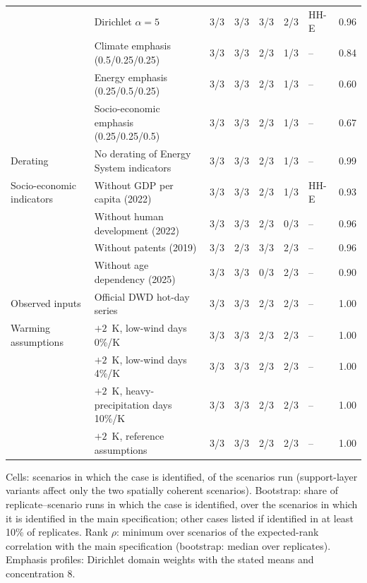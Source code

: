 \begin{tabular}{@{}p{2.9cm}p{5.4cm}ccccp{3.1cm}c@{}}
 & Dirichlet $\alpha=5$ & 3/3 & 3/3 & 3/3 & 2/3 & HH-E & 0.96 \\
 & Climate emphasis (0.5/0.25/0.25) & 3/3 & 3/3 & 2/3 & 1/3 & -- & 0.84 \\
 & Energy emphasis (0.25/0.5/0.25) & 3/3 & 3/3 & 2/3 & 1/3 & -- & 0.60 \\
 & Socio-economic emphasis (0.25/0.25/0.5) & 3/3 & 3/3 & 2/3 & 1/3 & -- & 0.67 \\
\midrule
Derating & No derating of Energy System indicators & 3/3 & 3/3 & 2/3 & 1/3 & -- & 0.99 \\
\midrule
Socio-economic indicators & Without GDP per capita (2022) & 3/3 & 3/3 & 2/3 & 1/3 & HH-E & 0.93 \\
 & Without human development (2022) & 3/3 & 3/3 & 2/3 & 0/3 & -- & 0.96 \\
 & Without patents (2019) & 3/3 & 2/3 & 3/3 & 2/3 & -- & 0.96 \\
 & Without age dependency (2025) & 3/3 & 3/3 & 0/3 & 2/3 & -- & 0.90 \\
\midrule
Observed inputs & Official DWD hot-day series & 3/3 & 3/3 & 2/3 & 2/3 & -- & 1.00 \\
\midrule
Warming assumptions & $+2$~K, low-wind days 0\%/K & 3/3 & 3/3 & 2/3 & 2/3 & -- & 1.00 \\
 & $+2$~K, low-wind days 4\%/K & 3/3 & 3/3 & 2/3 & 2/3 & -- & 1.00 \\
 & $+2$~K, heavy-precipitation days 10\%/K & 3/3 & 3/3 & 2/3 & 2/3 & -- & 1.00 \\
 & $+2$~K, reference assumptions & 3/3 & 3/3 & 2/3 & 2/3 & -- & 1.00 \\
\bottomrule
\end{tabular}
\par\smallskip\raggedright\scriptsize Cells: scenarios in which the case is identified, of the scenarios run (support-layer variants affect only the two spatially coherent scenarios). Bootstrap: share of replicate--scenario runs in which the case is identified, over the scenarios in which it is identified in the main specification; other cases listed if identified in at least 10\% of replicates. Rank $\rho$: minimum over scenarios of the expected-rank correlation with the main specification (bootstrap: median over replicates). Emphasis profiles: Dirichlet domain weights with the stated means and concentration 8.
